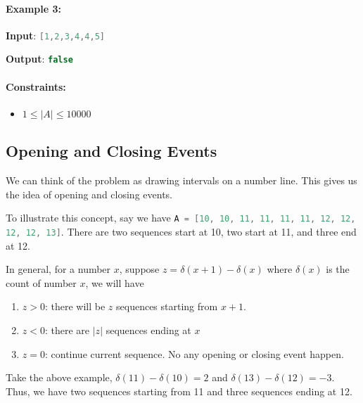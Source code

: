 \paragraph{Example 3:}

\begin{flushleft}
\textbf{Input}: \lstinline[language=C++, basicstyle=\small\ttfamily, keywordstyle=\bfseries\color{green!40!black}]|[1,2,3,4,4,5]|


\textbf{Output}: \lstinline[language=C++, basicstyle=\small\ttfamily, keywordstyle=\bfseries\color{green!40!black}]|false|
\end{flushleft}

 

\paragraph{Constraints:}

\begin{itemize}
\item  $ 1 \leq \lvert A\rvert \leq 10000$
\end{itemize}

\subsection{Opening and Closing Events}
We can think of the problem as drawing intervals on a number line. This gives us the idea of opening and closing events.

To illustrate this concept, say we have \lstinline[language=C++, basicstyle=\small\ttfamily, keywordstyle=\bfseries\color{green!40!black}]|A = [10, 10, 11, 11, 11, 11, 12, 12, 12, 12, 13]|. There are two sequences start at 10, two start at 11, and three end at 12.

In general, for a number $x$, suppose $z = \delta(x+1)-\delta(x)$ where $\delta(x)$ is the count of number $x$, we will have

\begin{enumerate}
\item $z > 0$: there will be $z$ sequences starting from $x+1$.
\item $z<0$: there are $\lvert z\rvert$ sequences ending at $x$
\item $z =0$: continue current sequence. No any opening or closing event happen.
\end{enumerate}

Take the above example, $\delta(11) - \delta(10)=2$ and $\delta(13) - \delta(12)=-3$. Thus, we have two sequences starting from 11 and three sequences ending at 12.

